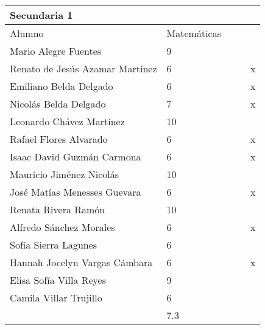 \begin{tabular}{lllll}
    \toprule
    Secundaria 1                      &                               &  &             &   \\
    \midrule
    Alumno                            & Matemáticas                   &  &             &   \\\hline
    Mario Alegre Fuentes              & 9                             &  &             &   \\\hline
    Renato de Jesús Azamar Martínez   & 6                             &  &             & x \\\hline
    Emiliano Belda Delgado            & 6                             &  &             & x \\\hline
    Nicolás Belda Delgado             & 7                             &  &             & x \\\hline
    Leonardo Chávez Martínez          & 10                            &  &             &   \\\hline
    Rafael Flores Alvarado            & 6                             &  &             & x \\\hline
    Isaac David Guzmán Carmona        & 6                             &  &             & x \\\hline
    Mauricio Jiménez Nicolás          & 10                            &  &             &   \\\hline
    José Matías Menesses Guevara      & 6                             &  &             & x \\\hline
    Renata Rivera Ramón               & 10                            &  &             &   \\\hline
    Alfredo Sánchez Morales           & 6                             &  &             & x \\\hline
    Sofía Sierra Lagunes              & 6                             &  &             &   \\\hline
    Hannah Jocelyn Vargas Cámbara     & 6                             &  &             & x \\\hline
    Elisa Sofía Villa Reyes           & 9                             &  &             &   \\\hline
    Camila Villar Trujillo            & 6                             &  &             &   \\\hline
                                      & 7.3                           &  &             &   \\\hline

\end{tabular}
